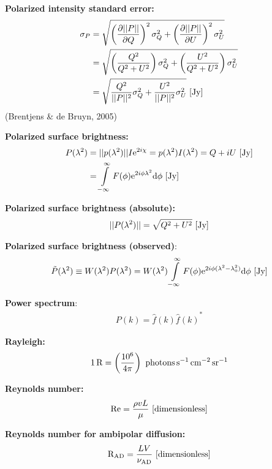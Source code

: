 \documentclass[a4paper,10pt]{article}
\begin{document}
{\noindent}\textbf{Polarized intensity standard error:}
\begin{align*}
\sigma_P &= \sqrt{ \left(\dfrac{\partial\lvert\lvert P \rvert\rvert}{\partial Q}\right)^2\sigma_Q^2 + \left(\dfrac{\partial\lvert\lvert P \rvert\rvert}{\partial U}\right)^2\sigma_U^2 } \\
&= \sqrt{ \left(\dfrac{Q^2}{Q^2+U^2}\right)\sigma_Q^2 + \left(\dfrac{U^2}{Q^2+U^2}\right)\sigma_U^2 } \\
&= \sqrt{ \dfrac{Q^2}{\lvert\lvert P \rvert\rvert^2}\sigma_Q^2 + \dfrac{U^2}{\lvert\lvert P \rvert\rvert^2}\sigma_U^2 } ~ [\rm Jy]
\end{align*}
(Brentjens \& de Bruyn, 2005)

{\noindent}\textbf{Polarized surface brightness:}
\begin{align*}
P(\lambda^2) &= \lvert\lvert p(\lambda^2) \rvert\rvert I\mathrm{e}^{2i\chi} = p(\lambda^2)I(\lambda^2) = Q+iU ~ [\rm Jy] \\
&= \int\limits_{-\infty}^\infty F(\phi)\mathrm{e}^{2i\phi\lambda^2}\mathrm{d}\phi ~ [\rm Jy]
\end{align*}

{\noindent}\textbf{Polarized surface brightness (absolute):}
\begin{align*}
\lvert\lvert P(\lambda^2) \rvert\rvert = \sqrt{Q^2+U^2} ~ [\rm Jy]
\end{align*}

{\noindent}\textbf{Polarized surface brightness (observed)}:
\begin{align*}
\tilde{P}(\lambda^2) \equiv W(\lambda^2)P(\lambda^2) = W(\lambda^2) \int\limits_{-\infty}^\infty F(\phi)\mathrm{e}^{2i\phi(\lambda^2-\lambda_0^2)}\mathrm{d}\phi ~ [\rm Jy]
\end{align*}

{\noindent}\textbf{Power spectrum}:
\begin{align*}
    P(k) = \hat{f}(k){\hat{f}(k)}^*
\end{align*}

{\noindent}\textbf{Rayleigh:}
\begin{align*}
    1\,{\rm R} = \left(\frac{10^6}{4\pi}\right) ~ {\rm photons\,s^{-1}\,cm^{-2}\,sr^{-1}}
\end{align*}

{\noindent}\textbf{Reynolds number:}
\begin{align*}
    {\rm Re} = \frac{\rho vL}{\mu} ~ [{\rm dimensionless}]
\end{align*}

{\noindent}\textbf{Reynolds number for ambipolar diffusion:}
\begin{align*}
    {\rm R}_\mathrm{\rm AD} = \dfrac{LV}{\nu_\mathrm{AD}} ~ [{\rm dimensionless}]
\end{align*}
\end{document}
